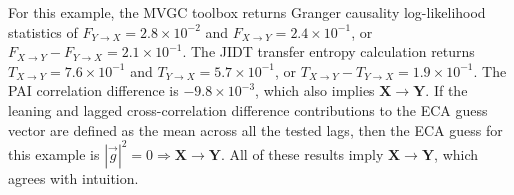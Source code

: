 
For this example, the MVGC toolbox returns Granger causality log-likelihood statistics of $F_{Y\rightarrow X}=2.8\times 10^{-2}$ and $F_{X\rightarrow Y}=2.4\times 10^{-1}$, or $F_{X\rightarrow Y}-F_{Y\rightarrow X}=2.1\times 10^{-1}$.  The JIDT transfer entropy calculation returns $T_{X\rightarrow Y}=7.6\times 10^{-1}$ and $T_{Y\rightarrow X}=5.7\times 10^{-1}$, or $T_{X\rightarrow Y}-T_{Y\rightarrow X}=1.9\times 10^{-1}$.  The PAI correlation difference is $-9.8\times 10^{-3}$, which also implies $\mathbf{X}\rightarrow\mathbf{Y}$.  If the leaning and lagged cross-correlation difference contributions to the ECA guess vector are defined as the mean across all the tested lags, then the ECA guess for this example is $|\vec{g}|^2=0\Rightarrow \mathbf{X}\rightarrow\mathbf{Y}$.  All of these results imply $\mathbf{X}\rightarrow\mathbf{Y}$, which agrees with intuition.  

